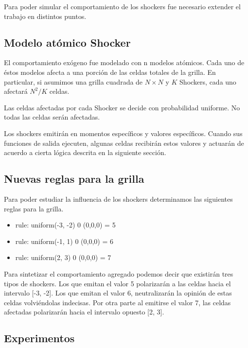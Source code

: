 Para poder simular el comportamiento de los shockers fue necesario extender el trabajo en distintos puntos.

\subsection{Modelo atómico Shocker}

El comportamiento exógeno fue modelado con n modelos atómicos. Cada uno de éstos modelos afecta a una porción de las celdas totales de la grilla.
En particular, si asumimos una grilla cuadrada de $N \times N$ y $K$ Shockers, cada uno afectará $N^2/K$ celdas.

Las celdas afectadas por cada Shocker se decide con probabilidad uniforme. No todas las celdas serán afectadas.

Los shockers emitirán en momentos específicos y valores específicos. Cuando sus funciones de salida ejecuten, algunas celdas recibirán estos valores y actuarán de acuerdo a cierta lógica descrita en la siguiente sección.


\subsection{Nuevas reglas para la grilla}

Para poder estudiar la influencia de los shockers determinamos las siguientes reglas para la grilla.

\begin{itemize}
    \item rule: {  uniform(-3, -2) } 0 { (0,0,0) = 5 }
    \item rule: {  uniform(-1, 1)  } 0 { (0,0,0) = 6 }
    \item rule: {  uniform(2, 3) } 0 { (0,0,0) = 7 } 
\end{itemize}

Para sintetizar el comportamiento agregado podemos decir que existirán tres tipos de shockers. Los que emitan el valor 5 polarizarán a las celdas hacia el intervalo [-3, -2]. Los que emitan el valor 6, neutralizarán la opinión de estas celdas volviéndolas indecisas. Por otra parte al emitirse el valor 7, las celdas afectadas polarizarán hacia el intervalo opuesto [2, 3].


\subsection{Experimentos}


